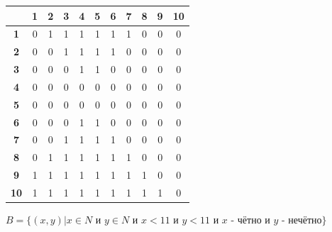 \documentclass[a4paper,14pt]{extarticle}
\begin{document}
\begin{enumerate}[label=1.\arabic*.]
\begin{center}
		      \begin{tabular}{|c|c|c|c|c|c|c|c|c|c|c|}
			      \hline
			                        & \textbf{1} & \textbf{2} & \textbf{3} & \textbf{4} & \textbf{5} & \textbf{6} & \textbf{7} & \textbf{8} & \textbf{9} & \textbf{10} \\
			      \hline\textbf{1}  & 0          & 1          & 1          & 1          & 1          & 1          & 1          & 0          & 0          & 0           \\
			      \hline\textbf{2}  & 0          & 0          & 1          & 1          & 1          & 1          & 0          & 0          & 0          & 0           \\
			      \hline\textbf{3}  & 0          & 0          & 0          & 1          & 1          & 0          & 0          & 0          & 0          & 0           \\
			      \hline\textbf{4}  & 0          & 0          & 0          & 0          & 0          & 0          & 0          & 0          & 0          & 0           \\
			      \hline\textbf{5}  & 0          & 0          & 0          & 0          & 0          & 0          & 0          & 0          & 0          & 0           \\
			      \hline\textbf{6}  & 0          & 0          & 0          & 1          & 1          & 0          & 0          & 0          & 0          & 0           \\
			      \hline\textbf{7}  & 0          & 0          & 1          & 1          & 1          & 1          & 0          & 0          & 0          & 0           \\
			      \hline\textbf{8}  & 0          & 1          & 1          & 1          & 1          & 1          & 1          & 0          & 0          & 0           \\
			      \hline\textbf{9}  & 1          & 1          & 1          & 1          & 1          & 1          & 1          & 1          & 0          & 0           \\
			      \hline\textbf{10} & 1          & 1          & 1          & 1          & 1          & 1          & 1          & 1          & 1          & 0           \\
			      \hline
		      \end{tabular}
	      \end{center}
	      \bigbreak
	      $B=\{(x, y) | x \in N \textit{ и } y \in N \textit{ и } x < 11 \textit{ и } y < 11 \textit{ и } x \textit{ - чётно и } y \textit{ - нечётно}  \}$\\

\end{enumerate}
\end{document}
